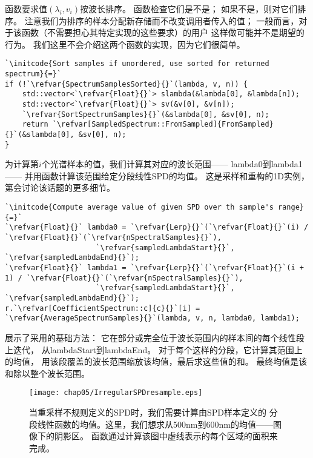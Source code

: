 函数要求值$(\lambda_i,v_i)$按波长排序。
{}函数检查它们是不是；
如果不是，则{}对它们排序。
注意我们为排序的样本分配新存储而不改变调用者传入的值；
一般而言，对于该函数（不需要担心其特定实现的这些要求）的用户
这样做可能并不是期望的行为。
我们这里不会介绍这两个函数的实现，因为它们很简单。
\begin{lstlisting}
`\initcode{Sort samples if unordered, use sorted for returned spectrum}{=}`
if (!`\refvar{SpectrumSamplesSorted}{}`(lambda, v, n)) {
    std::vector<`\refvar{Float}{}`> slambda(&lambda[0], &lambda[n]);
    std::vector<`\refvar{Float}{}`> sv(&v[0], &v[n]);
    `\refvar{SortSpectrumSamples}{}`(&slambda[0], &sv[0], n);
    return `\refvar[SampledSpectrum::FromSampled]{FromSampled}{}`(&slambda[0], &sv[0], n);
}
\end{lstlisting}

为计算第$i$个光谱样本的值，我们计算其对应的波长范围——
{\ttfamily lambda0}到{\ttfamily lambda1}——
并用函数计算该范围给定分段线性SPD的均值。
这是采样和重构的1D实例，第会讨论该话题的更多细节。
\begin{lstlisting}
`\initcode{Compute average value of given SPD over th sample's range}{=}`
`\refvar{Float}{}` lambda0 = `\refvar{Lerp}{}`(`\refvar{Float}{}`(i) / `\refvar{Float}{}`(`\refvar{nSpectralSamples}{}`), 
                     `\refvar{sampledLambdaStart}{}`, `\refvar{sampledLambdaEnd}{}`);
`\refvar{Float}{}` lambda1 = `\refvar{Lerp}{}`(`\refvar{Float}{}`(i + 1) / `\refvar{Float}{}`(`\refvar{nSpectralSamples}{}`), 
                     `\refvar{sampledLambdaStart}{}`, `\refvar{sampledLambdaEnd}{}`);
r.`\refvar[CoefficientSpectrum::c]{c}{}`[i] = `\refvar{AverageSpectrumSamples}{}`(lambda, v, n, lambda0, lambda1);
\end{lstlisting}

展示了采用的基础方法：
它在部分或完全位于波长范围内的样本间的每个线性段上迭代，
从{\ttfamily lambdaStart}到{\ttfamily lambdaEnd}。
对于每个这样的分段，它计算其范围上的均值，
用该段覆盖的波长范围缩放该均值，最后求这些值的和。
最终均值是该和除以整个波长范围。
\begin{figure}[htbp]
    \centering\texttt{[image: chap05/IrregularSPDresample.eps]}
    \caption{当重采样不规则定义的SPD时，我们需要计算由SPD样本定义的
        分段线性函数的均值。这里，我们想求从500nm到600nm的均值——图像下的阴影区。
        函数通过计算该图中虚线表示的每个区域的面积来完成。}
    \label{fig:5.2}
\end{figure}

